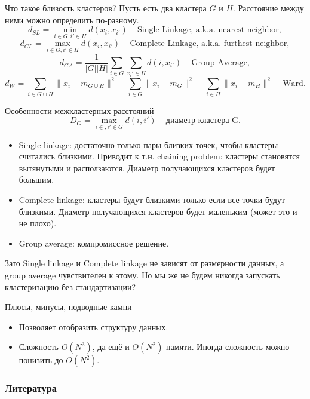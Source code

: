 \documentclass[9pt]{beamer}
\begin{document}
\begin{frame}{Что такое близость кластеров?}
Пусть есть два кластера $G$ и $H$. Расстояние между ними можно определить по-разному.
$$d_{SL} = \min_{i\in G, i'\in H} d(x_i, x_{i'}) \text{ -- Single Linkage, a.k.a. nearest-neighbor},$$
$$d_{CL} = \max_{i\in G, i'\in H} d(x_i, x_{i'}) \text{ -- Complete Linkage, a.k.a. furthest-neighbor},$$
$$d_{GA} = \frac{1}{|G||H|}\sum_{i\in G}\sum_{x_i'\in H}d(i, x_{i'})\text{ -- Group Average},$$
$$d_{W} = \sum_{i\in G\cup H}\|x_i - m_{G \cup H}\|^2 - \sum_{i\in G}\|x_i - m_G\|^2 - \sum_{i\in H}\|x_i - m_H\|^2\text{ -- Ward}.$$
\end{frame}

\begin{frame}{Особенности межкластерных расстояний}
$$D_G = \max_{i\in, i'\in G} d(i, i') \text{ -- диаметр кластера G}.$$
    \begin{itemize}
        \item Single linkage: достаточно только пары близких точек, чтобы кластеры считались близкими. Приводит к т.н. chaining problem: кластеры становятся вытянутыми и расползаются. Диаметр получающихся кластеров будет  большим.
        \item Complete linkage: кластеры будут близкими только если все точки будут близкими. Диаметр получающихся кластеров будет маленьким (может это и не плохо).
        \item Group average: компромиссное решение.
    \end{itemize}
Зато Single linkage и Complete linkage не зависят от размерности данных, а group average чувствителен к этому. Но мы же не будем никогда запускать кластеризацию без стандартизации?
\end{frame}


\begin{frame}{Плюсы, минусы, подводные камни}
    \begin{itemize}
        \item Позволяет отобразить структуру данных.
        \item Сложность $O(N^3)$, да ещё и $O(N^2)$ памяти. Иногда сложность можно понизить до $O(N^2)$. 
    \end{itemize}
\end{frame}

\begin{frame}[allowframebreaks]
    \frametitle{Литература}
    
    \nocite{esl, kmeanspp}
    
\end{frame}
\end{document}

